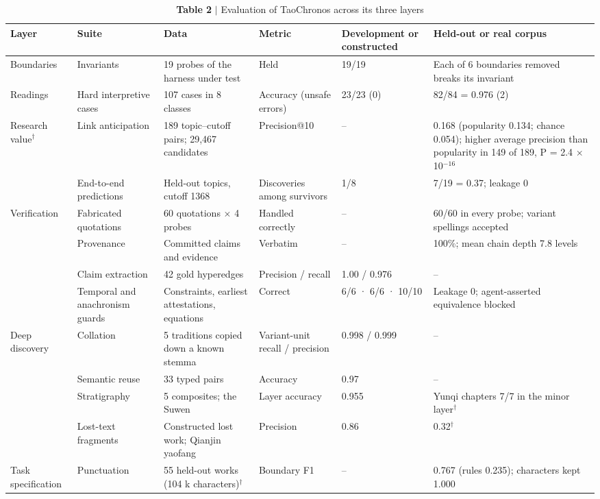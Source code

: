 \begin{table}[t]
\small
\caption{\textbf{Table 2} $|$ Evaluation of TaoChronos across its three layers}
\begin{tabular}{llllll}
\toprule
Layer & Suite & Data & Metric & Development or constructed & Held-out or real corpus \\
\midrule
Boundaries & Invariants & 19 probes of the harness under test & Held & 19/19 & Each of 6 boundaries removed breaks its invariant \\
Readings & Hard interpretive cases & 107 cases in 8 classes & Accuracy (unsafe errors) & 23/23 (0) & 82/84 = 0.976 (2) \\
Research value$^{\dagger}$ & Link anticipation & 189 topic–cutoff pairs; 29,467 candidates & Precision@10 & – & 0.168 (popularity 0.134; chance 0.054); higher average precision than popularity in 149 of 189, P = 2.4 $\times$ 10$^{-16}$ \\
 & End-to-end predictions & Held-out topics, cutoff 1368 & Discoveries among survivors & 1/8 & 7/19 = 0.37; leakage 0 \\
Verification & Fabricated quotations & 60 quotations $\times$ 4 probes & Handled correctly & – & 60/60 in every probe; variant spellings accepted \\
 & Provenance & Committed claims and evidence & Verbatim & – & 100\%; mean chain depth 7.8 levels \\
 & Claim extraction & 42 gold hyperedges & Precision / recall & 1.00 / 0.976 & – \\
 & Temporal and anachronism guards & Constraints, earliest attestations, equations & Correct & 6/6 · 6/6 · 10/10 & Leakage 0; agent-asserted equivalence blocked \\
Deep discovery & Collation & 5 traditions copied down a known stemma & Variant-unit recall / precision & 0.998 / 0.999 & – \\
 & Semantic reuse & 33 typed pairs & Accuracy & 0.97 & – \\
 & Stratigraphy & 5 composites; the Suwen & Layer accuracy & 0.955 & Yunqi chapters 7/7 in the minor layer$^{\dagger}$ \\
 & Lost-text fragments & Constructed lost work; Qianjin yaofang & Precision & 0.86 & 0.32$^{\dagger}$ \\
Task specification & Punctuation & 55 held-out works (104 k characters)$^{\dagger}$ & Boundary F1 & – & 0.767 (rules 0.235); characters kept 1.000 \\

\end{tabular}
\end{table}
